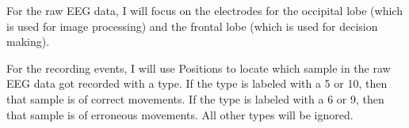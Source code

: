 \documentclass[12pt]{article}
\begin{document}
For the raw EEG data, I will focus on the electrodes for the occipital lobe (which is used for image processing) and the frontal lobe (which is used for decision making).

For the recording events, I will use Positions to locate which sample in the raw EEG data got recorded with a type. If the type is labeled with a 5 or 10, then that sample is of correct movements. If the type is labeled with a 6 or 9, then that sample is of erroneous movements. All other types will be ignored.
\end{document}
